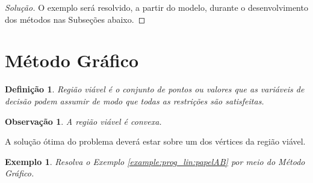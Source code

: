 \documentclass[
	12pt,				%
	openright,			%
	twoside,			%
	a4paper,			%
	english,			%
	french,				%
	brazil,				%
	sumario=tradicional
]{abntex2}
\newtheorem{example}{Exemplo}
\newtheorem{remark}{Observação}
\newtheorem{definition}{Definição}
\newenvironment{solution}{
	\begin{proof}[Solução]
}{\end{proof}}
\numberwithin{example}{chapter}
\numberwithin{remark}{chapter}
\numberwithin{definition}{chapter}
\numberwithin{figure}{chapter}
\begin{document}
\begin{solution}
    O exemplo será resolvido, a partir do modelo, durante o desenvolvimento dos métodos nas Subseções abaixo.
\end{solution}

\section{Método Gráfico}

\begin{definition}
    Região viável é o conjunto de pontos ou valores que as variáveis de decisão podem assumir de modo que todas as restrições são satisfeitas.
\end{definition}

\begin{remark}
    A região viável é convexa.
\end{remark}

A solução ótima do problema deverá estar sobre um dos vértices da região viável.

\begin{example}
	Resolva o Exemplo \ref{example:prog_lin:papelAB} por meio do Método Gráfico.
\end{example}
\end{document}
